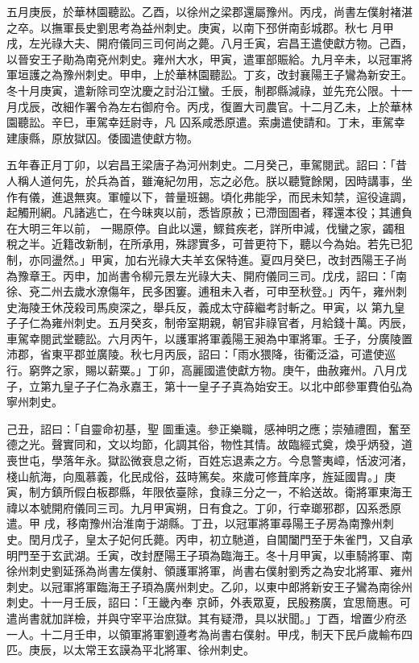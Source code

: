 \begin{pinyinscope}
 五月庚辰，於華林園聽訟。乙酉，以徐州之梁郡還屬豫州。丙戌，尚書左僕射褚湛之卒。以撫軍長史劉思考為益州刺史。庚寅，以南下邳併南彭城郡。秋七
 月甲戌，左光祿大夫、開府儀同三司何尚之薨。八月壬寅，宕昌王遣使獻方物。己酉，以晉安王子勛為南兗州刺史。雍州大水，甲寅，遣軍部賑給。九月辛未，以冠軍將軍垣護之為豫州刺史。甲申，上於華林園聽訟。丁亥，改封襄陽王子鸞為新安王。冬十月庚寅，遣新除司空沈慶之討沿江蠻。壬辰，制郡縣減祿，並先充公限。十一月戊辰，改細作署令為左右御府令。丙戌，復置大司農官。十二月乙未，上於華林園聽訟。辛巳，車駕幸廷尉寺，凡
 囚系咸悉原遣。索虜遣使請和。丁未，車駕幸建康縣，原放獄囚。倭國遣使獻方物。



 五年春正月丁卯，以宕昌王梁唐子為河州刺史。二月癸己，車駕閱武。詔曰：「昔人稱人道何先，於兵為首，雖淹紀勿用，忘之必危。朕以聽覽餘閑，因時講事，坐作有儀，進退無爽。軍幢以下，普量班錫。頃化弗能孚，而民未知禁，逭役違調，起觸刑網。凡諸逃亡，在今昧爽以前，悉皆原赦；已滯囹圄者，釋還本役；其逋負在大明三年以前，
 一賜原停。自此以還，鰥貧疾老，詳所申減，伐蠻之家，蠲租稅之半。近籍改新制，在所承用，殊謬實多，可普更符下，聽以今為始。若先已犯制，亦同盪然。」甲寅，加右光祿大夫羊玄保特進。夏四月癸巳，改封西陽王子尚為豫章王。丙申，加尚書令柳元景左光祿大夫、開府儀同三司。戊戌，詔曰：「南徐、兗二州去歲水潦傷年，民多困窶。逋租未入者，可申至秋登。」丙午，雍州刺史海陵王休茂殺司馬庾深之，舉兵反，義成太守薛繼考討斬之。甲寅，以
 第九皇子子仁為雍州刺史。五月癸亥，制帝室期親，朝官非祿官者，月給錢十萬。丙辰，車駕幸閱武堂聽訟。六月丙午，以護軍將軍義陽王昶為中軍將軍。壬子，分廣陵置沛郡，省東平郡並廣陵。秋七月丙辰，詔曰：「雨水猥降，街衢泛溢，可遣使巡行。窮弊之家，賜以薪粟。」丁卯，高麗國遣使獻方物。庚午，曲赦雍州。八月戊子，立第九皇子子仁為永嘉王，第十一皇子子真為始安王。以北中郎參軍費伯弘為寧州刺史。



 己丑，詔曰：「自靈命初基，聖
 圖重遠。參正樂職，感神明之應；崇殖禮囿，奮至德之光。聲實同和，文以均節，化調其俗，物性其情。故臨經式奠，煥乎炳發，道喪世屯，學落年永。獄訟微衰息之術，百姓忘退素之方。今息警夷嶂，恬波河渚，棧山航海，向風慕義，化民成俗，茲時篤矣。來歲可修葺庠序，旌延國胄。」庚寅，制方鎮所假白板郡縣，年限依臺除，食祿三分之一，不給送故。衛將軍東海王禕以本號開府儀同三司。九月甲寅朔，日有食之。丁卯，行幸瑯邪郡，囚系悉原遣。甲
 戌，移南豫州治淮南于湖縣。丁丑，以冠軍將軍尋陽王子房為南豫州刺史。閏月戊子，皇太子妃何氏薨。丙申，初立馳道，自閶闔門至于朱雀門，又自承明門至于玄武湖。壬寅，改封歷陽王子頊為臨海王。冬十月甲寅，以車騎將軍、南徐州刺史劉延孫為尚書左僕射、領護軍將軍，尚書右僕射劉秀之為安北將軍、雍州刺史。以冠軍將軍臨海王子頊為廣州刺史。乙卯，以東中郎將新安王子鸞為南徐州刺史。十一月壬辰，詔曰：「王畿內奉
 京師，外表眾夏，民殷務廣，宜思簡惠。可遣尚書就加詳檢，并與守宰平治庶獄。其有疑滯，具以狀聞。」丁酉，增置少府丞一人。十二月壬申，以領軍將軍劉遵考為尚書右僕射。甲戌，制天下民戶歲輸布四匹。庚辰，以太常王玄謨為平北將軍、徐州刺史。




\end{pinyinscope}
